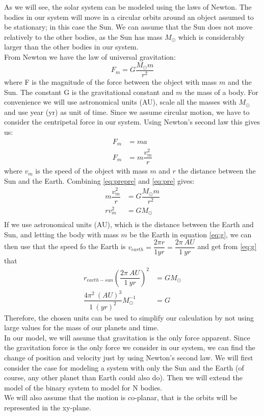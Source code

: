 \documentclass[12pt]{article}
\newcommand{\Ms}{M_\odot}
\begin{document}
	As we will see, the solar system can be modeled using the laws of Newton. The bodies in our system will move in a circular orbits around an object assumed to be stationary; in this case the Sun.  We can assume that the Sun does not move relatively to the other bodies, as the Sun has mass $\Ms$ which is considerably larger than the other bodies in our system. \\
	From Newton we have the law of universal gravitation: 
	\begin{equation}\label{eq:prepre}
	F_m = G\dfrac{\Ms m}{r^2}
	\end{equation}
	where F is the magnitude of the force between the object with mass $m$ and the Sun. 
	The constant G is the gravitational constant and $m$ the mass of a body. For convenience we will use astronomical units (AU), scale all the masses with $\Ms$ and use year (yr) as unit of time. Since we assume circular motion, we have to consider the centripetal force in our system. Using Newton's second law this gives us:
	\begin{equation} \label{eq:pre}
		\begin{aligned}
		F_m &= ma \\
		F_m &= m\dfrac{v_m^2}{r}
		\end{aligned}
	\end{equation}
	where $v_m$ is the speed of the object with mass $m$ and $r$ the distance between the Sun and the Earth.  Combining \ref{eq:prepre} and \ref{eq:pre} gives:
	\begin{equation} \label{eq:g}
	\begin{aligned}
	m\dfrac{v_m^2}{r} &=  G\dfrac{\Ms m}{r^2} \\
	rv_m^2 &=  G\Ms\\
	\end{aligned}
	\end{equation}
	If we use astronomical units (AU), which is the distance between the Earth and Sun, and letting the body with mass $m$ be the Earth in equation \ref{eq:g}, we can then use that the speed fo the Earth is $v_{earth} = \dfrac{2\pi r}{1 yr} = \dfrac{2\pi\:AU}{1\:yr} $
	and get from \ref{eq:g} that 
	\begin{equation*}
	\begin{aligned}
	r_{earth-sun}\left(\dfrac{2\pi\:AU}{1\:yr}\right)^2 &=  G\Ms \\
	\dfrac{4\pi^2\:(AU)^3}{1\:(yr)^2}\Ms^{-1}&=  G
	\end{aligned}
	\end{equation*}
	Therefore, the chosen units can be used to simplify our calculation by not using large values for the mass of our planets and time. 
	 \\In our model, we will assume that gravitation is the only force apparent. Since the gravitation force is the only force we consider in our system, we can find the change of position and velocity just by using Newton's second law. We will first consider the case for modeling a system with only the Sun and the Earth (of course, any other planet than Earth could also do). Then we will extend the model of the binary system to model for N bodies. \\ We will also assume that the motion is co-planar, that is the orbits will be represented in the xy-plane.  
\end{document}

